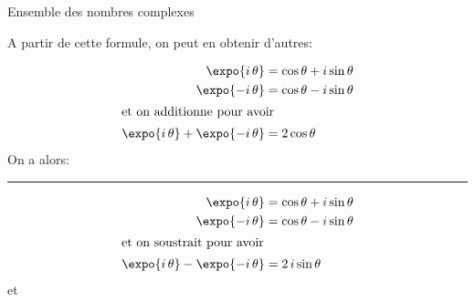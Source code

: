 \begin{chapter}{Ensemble des nombres complexes}
\begin{thm}
A partir de cette formule, on peut en obtenir d'autres: \\
\begin{minipage}{0.45 \actualtextwidth}
\begin{align*}
\expo{i \, \theta }   & = \cos \theta + i \sin \theta \\
\expo{- i \, \theta } & = \cos \theta - i \sin \theta \\
\intertext{et on additionne pour avoir}
\expo{i \, \theta } + \expo{ -i \, \theta } & = 2 \cos \theta \\
\end{align*}
On a alors: \\
\end{minipage}
\begin{minipage}[c][][c]{.02\actualtextwidth}
      \rule{.4pt}{10\baselineskip}
\end{minipage}
\begin{minipage}{0.45 \actualtextwidth}
\begin{align*}
\expo{i \, \theta }   & = \cos \theta + i \sin \theta \\
\expo{- i \, \theta } & = \cos \theta - i \sin \theta \\
\intertext{et on soustrait pour avoir}
\expo{i \, \theta } - \expo{ -i \, \theta } & = 2 \, i \sin \theta \\
\end{align*}
et \\
\end{minipage}
\end{thm}


\end{chapter}
